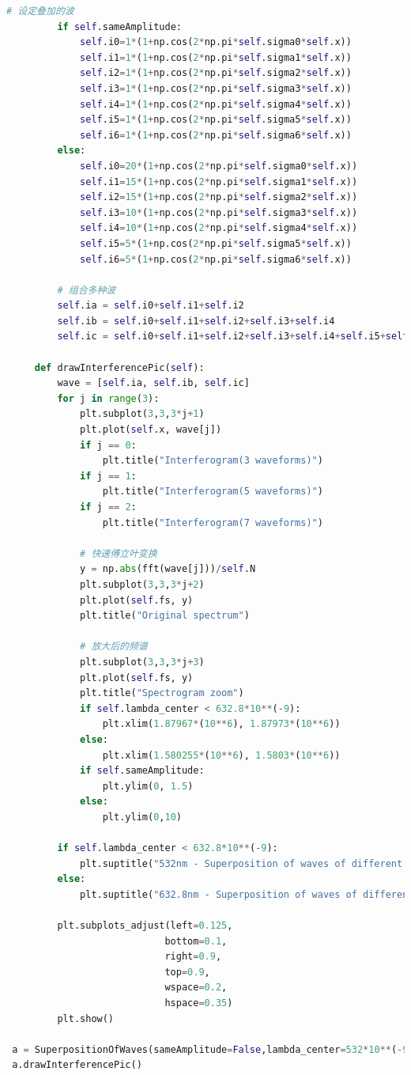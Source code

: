 \documentclass[conference]{IEEEtran}
\begin{document}
{\begin{lstlisting}[language=python]
         # 设定叠加的波
         if self.sameAmplitude:
             self.i0=1*(1+np.cos(2*np.pi*self.sigma0*self.x))
             self.i1=1*(1+np.cos(2*np.pi*self.sigma1*self.x))
             self.i2=1*(1+np.cos(2*np.pi*self.sigma2*self.x))
             self.i3=1*(1+np.cos(2*np.pi*self.sigma3*self.x))
             self.i4=1*(1+np.cos(2*np.pi*self.sigma4*self.x))
             self.i5=1*(1+np.cos(2*np.pi*self.sigma5*self.x))
             self.i6=1*(1+np.cos(2*np.pi*self.sigma6*self.x))
         else:
             self.i0=20*(1+np.cos(2*np.pi*self.sigma0*self.x))
             self.i1=15*(1+np.cos(2*np.pi*self.sigma1*self.x))
             self.i2=15*(1+np.cos(2*np.pi*self.sigma2*self.x))
             self.i3=10*(1+np.cos(2*np.pi*self.sigma3*self.x))
             self.i4=10*(1+np.cos(2*np.pi*self.sigma4*self.x))
             self.i5=5*(1+np.cos(2*np.pi*self.sigma5*self.x))
             self.i6=5*(1+np.cos(2*np.pi*self.sigma6*self.x))

         # 组合多种波
         self.ia = self.i0+self.i1+self.i2
         self.ib = self.i0+self.i1+self.i2+self.i3+self.i4
         self.ic = self.i0+self.i1+self.i2+self.i3+self.i4+self.i5+self.i6

     def drawInterferencePic(self):
         wave = [self.ia, self.ib, self.ic]
         for j in range(3):
             plt.subplot(3,3,3*j+1)
             plt.plot(self.x, wave[j])
             if j == 0:
                 plt.title("Interferogram(3 waveforms)")
             if j == 1:
                 plt.title("Interferogram(5 waveforms)")
             if j == 2:
                 plt.title("Interferogram(7 waveforms)")

             # 快速傅立叶变换
             y = np.abs(fft(wave[j]))/self.N
             plt.subplot(3,3,3*j+2)
             plt.plot(self.fs, y)
             plt.title("Original spectrum")

             # 放大后的频谱
             plt.subplot(3,3,3*j+3)
             plt.plot(self.fs, y)
             plt.title("Spectrogram zoom")
             if self.lambda_center < 632.8*10**(-9):
                 plt.xlim(1.87967*(10**6), 1.87973*(10**6))
             else:
                 plt.xlim(1.580255*(10**6), 1.5803*(10**6))
             if self.sameAmplitude:
                 plt.ylim(0, 1.5)
             else:
                 plt.ylim(0,10)
            
         if self.lambda_center < 632.8*10**(-9):
             plt.suptitle("532nm - Superposition of waves of different frequencies", fontsize = 20)  
         else:
             plt.suptitle("632.8nm - Superposition of waves of different frequencies", fontsize = 20)
        
         plt.subplots_adjust(left=0.125,
                            bottom=0.1, 
                            right=0.9, 
                            top=0.9, 
                            wspace=0.2, 
                            hspace=0.35)
         plt.show()

 a = SuperpositionOfWaves(sameAmplitude=False,lambda_center=532*10**(-9), sample_f=(632.8*10**(-9))/8, scan_length=2.0)
 a.drawInterferencePic()
\end{lstlisting}}
\end{document}
